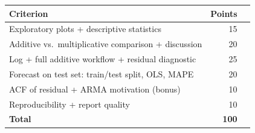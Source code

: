 \documentclass[a4paper,11pt]{article}
\begin{document}
\begin{center}
\begin{tabular}{p{8cm}rl}
\toprule
\textbf{Criterion} & \textbf{Points} & \\
\midrule
Exploratory plots + descriptive statistics            & 15 \\
Additive vs.\ multiplicative comparison + discussion  & 20 \\
Log + full additive workflow + residual diagnostic    & 25 \\
Forecast on test set: train/test split, OLS, MAPE     & 20 \\
ACF of residual + ARMA motivation (bonus)             & 10 \\
Reproducibility + report quality                      & 10 \\
\midrule
\textbf{Total}                                        & \textbf{100} \\
\bottomrule
\end{tabular}
\end{center}

\bigskip
\hfill\auteurNom\par
\hfill\auteurEmail\par
\end{document}
